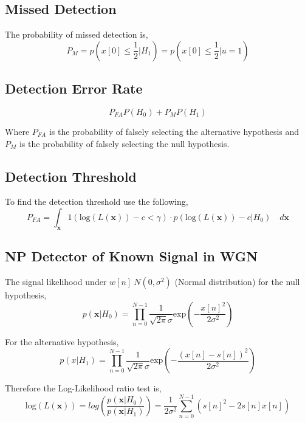 \documentclass[12pt]{article}
\begin{document}
\subsection{Missed Detection}

The probability of missed detection is,
\begin{equation}
    P_M = p(x[0] \leq \frac{1}{2}| H_1) = p(x[0] \leq \frac{1}{2}|u = 1)
\end{equation}

\subsection{Detection Error Rate}

\begin{equation}
    P_{FA}P(H_0) + P_MP(H_1)
\end{equation}

Where $P_{FA}$ is the probability of falsely selecting the alternative hypothesis and $P_M$ is the probability
of falsely selecting the null hypothesis.

\subsection{Detection Threshold}
To find the detection threshold use the following,
\begin{equation}
    P_{FA} = \int_{\textbf{x}} 1(\textrm{log}(L(\textbf{x})) - c < \gamma) \cdot p(\textrm{log}(L(\textbf{x})) - c|H_0) \quad d\textbf{x} 
\end{equation}

\subsection{NP Detector of Known Signal in WGN}
The signal likelihood under $w[n]~N(0,\sigma^2)$ (Normal distribution) for the null hypothesis,
\begin{equation}
    p(\textbf{x}|H_0) = \prod_{n=0}^{N-1} \frac{1}{\sqrt{2\pi}\sigma}\textrm{exp}\left(-\frac{x[n]^2}{2\sigma^2}\right)
\end{equation}

For the alternative hypothesis,
\begin{equation}
    p(x|H_1) = \prod_{n=0}^{N-1}  \frac{1}{\sqrt{2\pi}\sigma}\textrm{exp}\left(-\frac{(x[n]-s[n])^2}{2\sigma^2}\right)
\end{equation}

Therefore the Log-Likelihood ratio test is,
\begin{equation}
    \textrm{log}(L(\textbf{x})) = log\left(\frac{p(\textbf{x}|H_0)}{p(\textbf{x}|H_1)}\right) = \frac{1}{2\sigma^2} \sum_{n=0}^{N-1} (s[n]^2 - 2s[n]x[n])
\end{equation}
\end{document}
